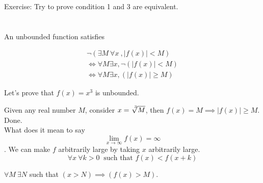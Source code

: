 \documentclass[a4paper, 11pt, twoside]{article}
\begin{document}
Exercise: Try to prove condition 1 and 3 are equivalent.\\\\\\

An unbounded function satisfies

\[
\begin{split}
	\neg (\exists M\ \forall x\ ,|f(x)| < M)\\
	\iff \forall M \exists x, \neg (|f(x)|< M)\\
	\iff \forall M \exists x, (|f(x)| \geq M)
\end{split}
\]

Let's prove that $f(x)=x^3$ is unbounded.

Given any real number $M$, consider $x=\sqrt[\leftroot{-3}\uproot{3}3]{M}$, then $f(x)=M\implies |f(x)|\geq M.$ Done.\\

What does it mean to say $$\lim_{x\to\infty}f(x)=\infty$$. We can make $f$ arbitrarily large by taking $x$ arbitrarily large. \[\forall x\ \forall k>0\ \text{ such that } f(x) < f(x+k)\]

$\forall M\ \exists N$ such that $(x>N)\implies(f(x)>M).$
\end{document}
